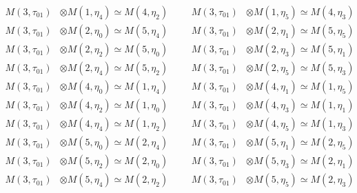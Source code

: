 \begin{align*}
M(3,\tau_{01}) &\otimes M(1,\eta_{4}) \simeq M(4,\eta_{2}) &&& M(3,\tau_{01}) &\otimes M(1,\eta_{5}) \simeq M(4,\eta_{3})\\
M(3,\tau_{01}) &\otimes M(2,\eta_{0}) \simeq M(5,\eta_{4}) &&& M(3,\tau_{01}) &\otimes M(2,\eta_{1}) \simeq M(5,\eta_{5})\\
M(3,\tau_{01}) &\otimes M(2,\eta_{2}) \simeq M(5,\eta_{0}) &&& M(3,\tau_{01}) &\otimes M(2,\eta_{3}) \simeq M(5,\eta_{1})\\
M(3,\tau_{01}) &\otimes M(2,\eta_{4}) \simeq M(5,\eta_{2}) &&& M(3,\tau_{01}) &\otimes M(2,\eta_{5}) \simeq M(5,\eta_{3})\\
M(3,\tau_{01}) &\otimes M(4,\eta_{0}) \simeq M(1,\eta_{4}) &&& M(3,\tau_{01}) &\otimes M(4,\eta_{1}) \simeq M(1,\eta_{5})\\
M(3,\tau_{01}) &\otimes M(4,\eta_{2}) \simeq M(1,\eta_{0}) &&& M(3,\tau_{01}) &\otimes M(4,\eta_{3}) \simeq M(1,\eta_{1})\\
M(3,\tau_{01}) &\otimes M(4,\eta_{4}) \simeq M(1,\eta_{2}) &&& M(3,\tau_{01}) &\otimes M(4,\eta_{5}) \simeq M(1,\eta_{3})\\
M(3,\tau_{01}) &\otimes M(5,\eta_{0}) \simeq M(2,\eta_{4}) &&& M(3,\tau_{01}) &\otimes M(5,\eta_{1}) \simeq M(2,\eta_{5})\\
M(3,\tau_{01}) &\otimes M(5,\eta_{2}) \simeq M(2,\eta_{0}) &&& M(3,\tau_{01}) &\otimes M(5,\eta_{3}) \simeq M(2,\eta_{1})\\
M(3,\tau_{01}) &\otimes M(5,\eta_{4}) \simeq M(2,\eta_{2}) &&& M(3,\tau_{01}) &\otimes M(5,\eta_{5}) \simeq M(2,\eta_{3})\\
\end{align*}

